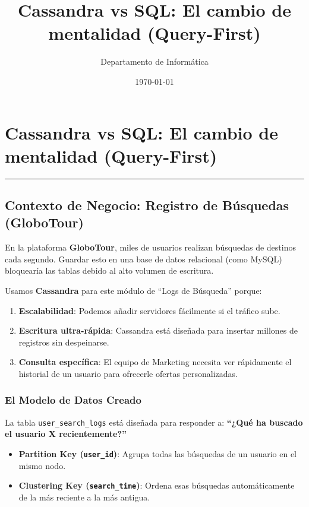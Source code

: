 \documentclass[12pt,a4paper]{article}
\title{\textbf{Cassandra vs SQL: El cambio de mentalidad (Query-First)}}
\author{Departamento de Informática}
\date{\today}
\begin{document}
\maketitle

\section{Cassandra vs SQL: El cambio de mentalidad (Query-First)}\label{cassandra-vs-sql-el-cambio-de-mentalidad-query-first}

\begin{center}\rule{0.5\linewidth}{0.5pt}\end{center}

\subsection{Contexto de Negocio: Registro de Búsquedas (GloboTour)}\label{contexto-de-negocio-registro-de-buxfasquedas-globotour}

En la plataforma \textbf{GloboTour}, miles de usuarios realizan búsquedas de destinos cada segundo. Guardar esto en una base de datos relacional (como MySQL) bloquearía las tablas debido al alto volumen de escritura.

Usamos \textbf{Cassandra} para este módulo de \enquote{Logs de Búsqueda} porque:
\begin{enumerate}
    \item \textbf{Escalabilidad}: Podemos añadir servidores fácilmente si el tráfico sube.
    \item \textbf{Escritura ultra-rápida}: Cassandra está diseñada para insertar millones de registros sin despeinarse.
    \item \textbf{Consulta específica}: El equipo de Marketing necesita ver rápidamente el historial de un usuario para ofrecerle ofertas personalizadas.
\end{enumerate}

\subsubsection{El Modelo de Datos Creado}

La tabla \texttt{user\_search\_logs} está diseñada para responder a: \textbf{\enquote{¿Qué ha buscado el usuario X recientemente?}}

\begin{itemize}
    \item \textbf{Partition Key (\texttt{user\_id})}: Agrupa todas las búsquedas de un usuario en el mismo nodo.
    \item \textbf{Clustering Key (\texttt{search\_time})}: Ordena esas búsquedas automáticamente de la más reciente a la más antigua.
\end{itemize}
\end{document}
